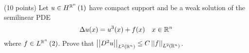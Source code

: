 (10 points)
Let $u \in \sobolevh{1}{\reals^n}$ have compact support and be a weak solution
of the semilinear PDE
\begin{align*}
  \Delta u(x) = u^3(x) + f(x) & & x \in \reals^n
\end{align*}
where $f \in \lnfunc{2}{\reals^n}$.
Prove that $\lnorm{\grad^2 u}{2}{\reals^n} \leq C \lnorm{f}{2}{\reals^n}$.
